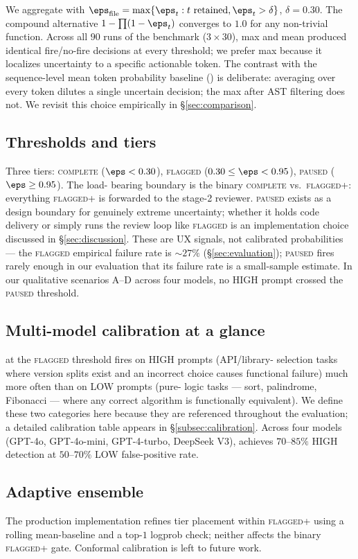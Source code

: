 We aggregate with
$\eps_\text{file} = \max\{\eps_t : t \text{ retained}, \eps_t > \delta\}$,
$\delta = 0.30$. The compound alternative
$1 - \prod(1 - \eps_t)$ converges to $1.0$ for any non-trivial function.
Across all $90$ runs of the benchmark ($3 \times 30$), max and mean
produced identical fire/no-fire decisions at every threshold; we prefer
max because it localizes uncertainty to a specific actionable token. The
contrast with the sequence-level mean token probability baseline
(\papg) is deliberate: averaging over every token dilutes a single
uncertain decision; the max after AST filtering does not. We revisit
this choice empirically in \S\ref{sec:comparison}.

\subsection{Thresholds and tiers}
\label{subsec:tiers}

Three tiers: \textsc{complete} ($\eps < 0.30$), \textsc{flagged}
($0.30 \le \eps < 0.95$), \textsc{paused} ($\eps \ge 0.95$). The load-%
bearing boundary is the binary \textsc{complete} vs.\ \textsc{flagged+}:
everything \textsc{flagged+} is forwarded to the stage-2 reviewer.
\textsc{paused} exists as a design boundary for genuinely extreme
uncertainty; whether it holds code delivery or simply runs the review
loop like \textsc{flagged} is an implementation choice discussed in
\S\ref{sec:discussion}. These are UX signals, not calibrated
probabilities --- the \textsc{flagged} empirical failure rate is
$\sim 27\%$ (\S\ref{sec:evaluation}); \textsc{paused} fires rarely
enough in our evaluation that its failure rate is a small-sample
estimate. In our qualitative scenarios A--D across four models, no
HIGH prompt crossed the \textsc{paused} threshold.

\subsection{Multi-model calibration at a glance}
\label{subsec:calibration-preview}

\eps at the \textsc{flagged} threshold fires on HIGH prompts (API/library-%
selection tasks where version splits exist and an incorrect choice
causes functional failure) much more often than on LOW prompts (pure-%
logic tasks --- sort, palindrome, Fibonacci --- where any correct
algorithm is functionally equivalent). We define these two categories
here because they are referenced throughout the evaluation; a detailed
calibration table appears in \S\ref{subsec:calibration}. Across four
models (GPT-4o, GPT-4o-mini, GPT-4-turbo, DeepSeek V3), \eps achieves
$70$--$85\%$ HIGH detection at $50$--$70\%$ LOW false-positive rate.

\subsection{Adaptive ensemble}
\label{subsec:ensemble}

The production implementation refines tier placement within
\textsc{flagged+} using a rolling mean-\eps baseline and a top-$1$
logprob check; neither affects the binary \textsc{flagged+} gate.
Conformal calibration is left to future work.
